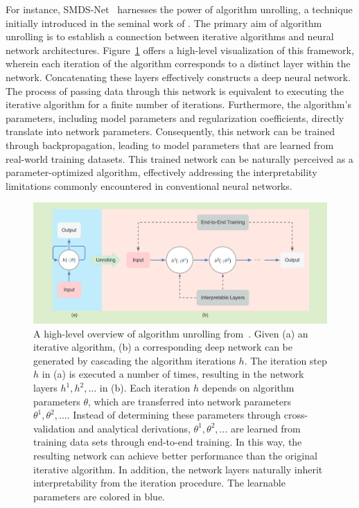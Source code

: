 For instance, SMDS-Net~\cite{xiong_smds-net_2020} harnesses the power of algorithm unrolling, a technique initially introduced in the seminal work of \cite{gregor_learning_2010}.
The primary aim of algorithm unrolling is to establish a connection between iterative algorithms and neural network architectures.
Figure~\ref{fig:unrolling} offers a high-level visualization of this framework, wherein each iteration of the algorithm corresponds to a distinct layer within the network.
Concatenating these layers effectively constructs a deep neural network.
The process of passing data through this network is equivalent to executing the iterative algorithm for a finite number of iterations.
Furthermore, the algorithm's parameters, including model parameters and regularization coefficients, directly translate into network parameters.
Consequently, this network can be trained through backpropagation, leading to model parameters that are learned from real-world training datasets.
This trained network can be naturally perceived as a parameter-optimized algorithm, effectively addressing the interpretability limitations commonly encountered in conventional neural networks.

\begin{figure}[h]
	\centering
	\includegraphics[width=\textwidth]{AlgorithmUnrolling.png}
	\caption{A high-level overview of algorithm unrolling from~\cite{monga_algorithm_2021}. 
 Given (a) an iterative algorithm, (b) a corresponding deep network can be generated by cascading the algorithm iterations $h$. 
 The iteration step $h$ in (a) is executed a number of times, resulting in the network layers $h^1, h^2, \ldots$ in (b). 
 Each iteration $h$ depends on algorithm parameters $\theta$, which are transferred into network parameters $\theta^1, \theta^2, \ldots$.
 Instead of determining these parameters through cross-validation and analytical derivations, $\theta^1, \theta^2, \ldots$ are learned from training data sets through end-to-end training.
 In this way, the resulting network can achieve better performance than the original iterative algorithm.
 In addition, the network layers naturally inherit interpretability from the iteration procedure.
 The learnable parameters are colored in blue.
 }
	\label{fig:unrolling}
\end{figure}


